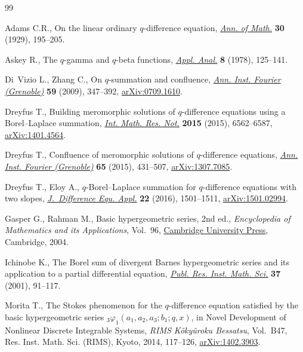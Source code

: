 \documentclass[pdftex]{sigma}
\numberwithin{equation}{section}
\begin{document}
\begin{thebibliography}{99}
\footnotesize\itemsep=0pt

Adams C.R., On the linear ordinary {$q$}-difference equation, \href{https://doi.org/10.2307/1968274}{\textit{Ann. of
 Math.}} \textbf{30} (1929), 195--205.

Askey R., The {$q$}-gamma and {$q$}-beta functions, \href{https://doi.org/10.1080/00036817808839221}{\textit{Appl. Anal.}}
 \textbf{8} (1978), 125--141.

Di~Vizio L., Zhang C., On {$q$}-summation and confluence, \href{https://doi.org/10.5802/aif.2433}{\textit{Ann. Inst.
 Fourier (Grenoble)}} \textbf{59} (2009), 347--392, \href{https://arxiv.org/abs/0709.1610}{arXiv:0709.1610}.

Dreyfus T., Building meromorphic solutions of {$q$}-difference equations using
 a {B}orel--{L}aplace summation, \href{https://doi.org/10.1093/imrn/rnu137}{\textit{Int. Math. Res. Not.}} \textbf{2015}
 (2015), 6562--6587, \href{https://arxiv.org/abs/1401.4564}{arXiv:1401.4564}.

Dreyfus T., Confluence of meromorphic solutions of {$q$}-difference equations,
 \href{https://doi.org/10.5802/aif.2937}{\textit{Ann. Inst. Fourier (Grenoble)}} \textbf{65} (2015), 431--507,
 \href{https://arxiv.org/abs/1307.7085}{arXiv:1307.7085}.

Dreyfus T., Eloy A., {$q$}-{B}orel--{L}aplace summation for {$q$}-difference
 equations with two slopes, \href{https://doi.org/10.1080/10236198.2016.1209192}{\textit{J.~Difference Equ. Appl.}} \textbf{22}
 (2016), 1501--1511, \href{https://arxiv.org/abs/1501.02994}{arXiv:1501.02994}.

Gasper G., Rahman M., Basic hypergeometric series, 2nd ed., \textit{Encyclopedia of
 Mathematics and its Applications}, Vol.~96, \href{https://doi.org/10.1017/CBO9780511526251}{Cambridge University
 Press}, Cambridge, 2004.

Ichinobe K., The {B}orel sum of divergent {B}arnes hypergeometric series and
 its application to a partial differential equation, \href{https://doi.org/10.2977/prims/1145476691}{\textit{Publ. Res. Inst.
 Math. Sci.}} \textbf{37} (2001), 91--117.

Morita T., The {S}tokes phenomenon for the {$q$}-difference equation satisfied
 by the basic hypergeometric series {${}_3\varphi_1(a_1,a_2,a_3;b_1;q,x)$}, in
 Novel Development of Nonlinear Discrete Integrable Systems, \textit{RIMS
 K\^{o}ky\^{u}roku Bessatsu}, Vol.~B47, Res. Inst. Math. Sci. (RIMS), Kyoto, 2014,
 117--126, \href{https://arxiv.org/abs/1402.3903}{arXiv:1402.3903}.


\end{thebibliography}
\end{document}
